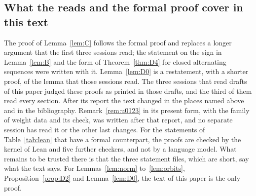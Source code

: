 \documentclass[11pt]{amsart}
\theoremstyle{definition}
\theoremstyle{remark}
\numberwithin{equation}{section}
\begin{document}
\subsection*{What the reads and the formal proof cover in this text} The proof of Lemma~\ref{lem:C}
follows the formal proof and replaces a longer argument that the first three sessions read; the
statement on the sign in Lemma~\ref{lem:B} and the form of Theorem~\ref{thm:D4} for closed alternating
sequences were written with it. Lemma~\ref{lem:D0} is a restatement, with a shorter proof, of the lemma
that those sessions read. The three sessions that read drafts of this paper judged these proofs as
printed in those drafts, and the third of them read every section. After its report the text changed
in the places named above and in the bibliography. Remark~\ref{rem:u0123} in its present form, with
the family of weight data and its check, was written after that report, and no separate session has
read it or the other last changes. For the statements of Table~\ref{tab:lean} that have a formal counterpart, the
proofs are checked by the kernel of Lean and five further checkers, and not by a language model. What
remains to be trusted there is that the three statement files, which are short, say what the text
says. For Lemmas~\ref{lem:norm} to~\ref{lem:orbits}, Proposition~\ref{prop:D2} and Lemma~\ref{lem:D0},
the text of this paper is the only proof.



\end{document}
